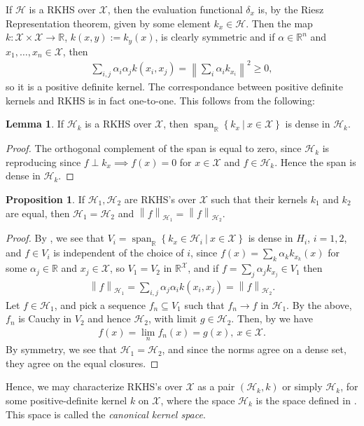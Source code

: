 \documentclass[10pt,twoside,openany,final]{memoir}
\theoremstyle{definition}
\newtheorem{lemma}[theorem]{Lemma}
\newtheorem{proposition}[theorem]{Proposition}
\theoremstyle{Break}
\newcommand{\lv}{\left\lVert}
\newcommand{\rv}{\right\rVert}
\newcommand{\R}{\mathbb{R}}
\renewcommand{\H}{\mathcal{H}}
\DeclareMathOperator{\Span}{span}
\begin{document}
If $\H$ is a RKHS over $\mathcal{X}$, then the evaluation functional $\delta_x$ is, by the Riesz Representation theorem, given by some element $k_x \in \H$. Then the map $k \colon \mathcal{X} \times \mathcal{X} \to \R$, $k(x,y):= k_y\left( x \right)$, is clearly symmetric and if $\alpha \in \R^n$ and $x_1,\dots,x_n \in \mathcal{X}$, then 
\begin{align*}
	\sum_{i,j}\alpha_i \alpha_j k(x_i,x_j) = \lv \sum_i \alpha_i k_{x_i} \rv^2 \geq 0,
\end{align*}
so it is a positive definite kernel. The correspondance between positive definite kernels and RKHS is in fact one-to-one. This follows from the following:
\begin{lemma}
	If $\H_k$ is a RKHS over $\mathcal{X}$, then $\Span_\R\left\{ k_x \ | \ x \in \mathcal{X} \right\}$ is dense in $\H_k$.
	\label{paul3.1}
\end{lemma}
\begin{proof}
	The orthogonal complement of the span is equal to zero, since $\H_k$ is reproducing since $f \perp k_x \implies f(x)=0$ for $x \in \mathcal{X}$ and $f \in \H_k$. Hence the span is dense in $\H_k$. 
\end{proof}
\begin{proposition}
	If $\H_1, \H_2$ are RKHS's over $\mathcal{X}$ such that their kernels $k_1$ and $k_2$ are equal, then $\H_1 = \H_2$ and $\lv f \rv_{\H_1} = \lv f \rv_{\H_2}$.
\end{proposition}
\begin{proof}
	By , we see that $V_i = \Span_\R \left\{ k_{x} \in \H_i \ | \ x \in \mathcal{X} \right\}$ is dense in $H_i$, $i = 1,2$, and $f \in V_i$ is independent of the choice of $i$, since $f(x) = \sum_{k} \alpha_k k_{x_k}(x)$ for some $\alpha_j \in \R$ and $x_j \in \mathcal{X}$, so $V_1=V_2$ in $\R^{\mathcal{X}}$, and if $f = \sum_j \alpha_j k_{x_j} \in V_1$ then 
	\begin{align*}
		\lv f \rv_{\H_1} = \sum_{i,j} \alpha_j \alpha_i k(x_i,x_j) = \lv f \rv_{\H_2}.
	\end{align*}
	Let $f \in \H_1$, and pick a sequence $f_n \subseteq V_1$ such that $f_n \to f$ in $\H_1$. By the above, $f_n$ is Cauchy in $V_2$ and hence $\H_2$, with limit $g \in \H_2$. Then, by  we have
	\begin{align*}
		f(x) = \lim_n f_n(x) = g(x), \ x \in \mathcal{X}.
	\end{align*}
	By symmetry, we see that $\H_1 = \H_2$, and since the norms agree on a dense set, they agree on the equal closures.
\end{proof}
Hence, we may characterize RKHS's over $\mathcal{X}$ as a pair $(\H_k,k)$ or simply $\H_k$, for some positive-definite kernel $k$ on $\mathcal{X}$, where the space $\H_k$ is the space defined in . This space is called the \emph{canonical kernel space}. 
\end{document}

